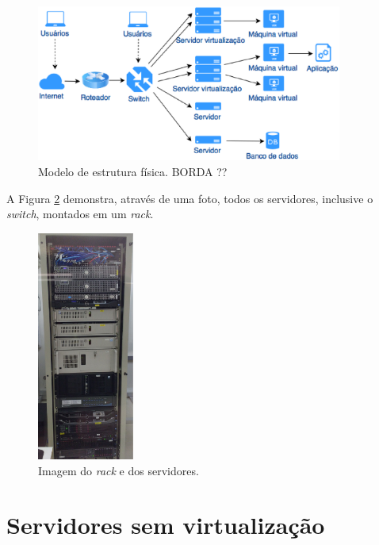 \begin{figure}[h!]
 \centering
 \includegraphics[width=380px]{img/servfisicos.eps}
 \caption{Modelo de estrutura física. BORDA ??}
 \label{fig:servfisicos}
\end{figure}

A Figura \ref{fig:servrack} demonstra, através de uma foto, todos os servidores, inclusive o \textit{switch}, montados em um \textit{rack}.

\begin{figure}[h!]
 \centering
 \includegraphics[width=120px]{img/servrack.eps}
 \caption{Imagem do \textit{rack} e dos servidores.}
 \label{fig:servrack}
\end{figure}

\section{Servidores sem virtualização}
\label{section:servsemvirt}

